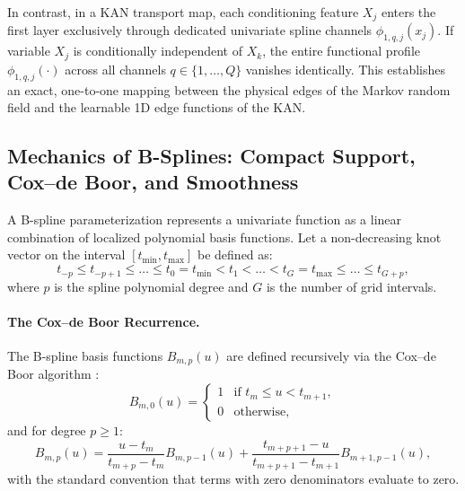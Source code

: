 \documentclass[11pt,a4paper]{article}
\theoremstyle{plain}
\theoremstyle{definition}
\theoremstyle{remark}
\begin{document}
In contrast, in a KAN transport map, each conditioning feature $X_j$ enters the first layer exclusively through dedicated univariate spline channels $\phi_{1, q, j}(x_j)$. If variable $X_j$ is conditionally independent of $X_k$, the entire functional profile $\phi_{1, q, j}(\cdot)$ across all channels $q \in \{1, \dots, Q\}$ vanishes identically. This establishes an exact, one-to-one mapping between the physical edges of the Markov random field and the learnable 1D edge functions of the KAN.

\subsection{Mechanics of B-Splines: Compact Support, Cox--de Boor, and Smoothness}

A B-spline parameterization represents a univariate function as a linear combination of localized polynomial basis functions. Let a non-decreasing knot vector on the interval $[t_{\min}, t_{\max}]$ be defined as:
\begin{equation}
    t_{-p} \le t_{-p+1} \le \dots \le t_0 = t_{\min} < t_1 < \dots < t_G = t_{\max} \le \dots \le t_{G+p},
\end{equation}
where $p$ is the spline polynomial degree and $G$ is the number of grid intervals.

\paragraph{The Cox--de Boor Recurrence.}
The B-spline basis functions $B_{m, p}(u)$ are defined recursively via the Cox--de Boor algorithm \cite{de1978practical}:
\begin{equation}
    B_{m, 0}(u) = \begin{cases}
        1 & \text{if } t_m \le u < t_{m+1}, \\
        0 & \text{otherwise},
    \end{cases}
\end{equation}
and for degree $p \ge 1$:
\begin{equation}
    B_{m, p}(u) = \frac{u - t_m}{t_{m+p} - t_m} B_{m, p-1}(u) + \frac{t_{m+p+1} - u}{t_{m+p+1} - t_{m+1}} B_{m+1, p-1}(u),
    \label{eq:cox_de_boor}
\end{equation}
with the standard convention that terms with zero denominators evaluate to zero.
\end{document}
